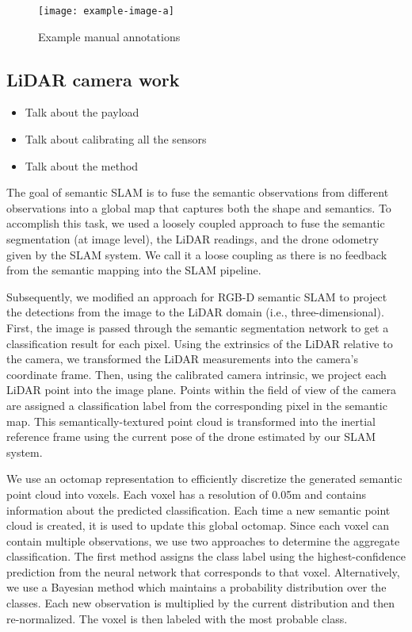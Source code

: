 \begin{figure}
    \centering
    \texttt{[image: example-image-a]}
    \caption{Example manual annotations}
    \label{fig:methods:manual-annotations}
\end{figure}

\subsection{LiDAR camera work}
\begin{itemize}
    \item Talk about the payload
    \item Talk about calibrating all the sensors
    \item Talk about the method
\end{itemize}
The goal of semantic SLAM is to fuse the semantic observations from different observations into a global map that captures both the shape and semantics. To accomplish this task, we used a loosely coupled approach to fuse the semantic segmentation (at image level), the LiDAR readings, and the drone odometry given by the SLAM system. We call it a loose coupling as there is no feedback from the semantic mapping into the SLAM pipeline.

 
Subsequently, we modified an approach for RGB-D semantic SLAM \cite{semantic_slam} to project the detections from the image to the LiDAR domain (i.e., three-dimensional). First, the image is passed through the semantic segmentation network to get a classification result for each pixel. Using the extrinsics of the LiDAR relative to the camera, we transformed the LiDAR measurements into the camera's coordinate frame. Then, using the calibrated camera intrinsic, we project each LiDAR point into the image plane. Points within the field of view of the camera are assigned a classification label from the corresponding pixel in the semantic map. This semantically-textured point cloud is transformed into the inertial reference frame using the current pose of the drone estimated by our SLAM system. 

We use an octomap \cite{hornung13auro} representation to efficiently discretize the generated semantic point cloud into voxels. Each voxel has a resolution of 0.05m and contains information about the predicted classification. Each time a new semantic point cloud is created, it is used to update this global octomap. Since each voxel can contain multiple observations, we use two approaches to determine the aggregate classification. The first method assigns the class label using the highest-confidence prediction from the neural network that corresponds to that voxel. Alternatively, we use a Bayesian method which maintains a probability distribution over the classes. Each new observation is multiplied by the current distribution and then re-normalized. The voxel is then labeled with the most probable class.

